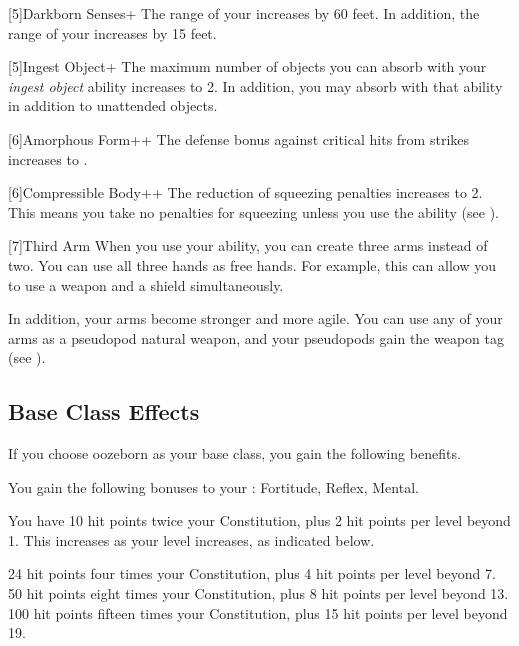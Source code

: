         [5]{Darkborn Senses+} The range of your  increases by 60 feet.
        In addition, the range of your  increases by 15 feet.

        [5]{Ingest Object+} The maximum number of objects you can absorb with your \textit{ingest object} ability increases to 2.
        In addition, you may absorb  with that ability in addition to unattended objects.

        [6]{Amorphous Form++} The defense bonus against critical hits from strikes increases to .

        [6]{Compressible Body++} The reduction of squeezing penalties increases to 2.
        This means you take no penalties for squeezing unless you use the  ability (see ).

        [7]{Third Arm} When you use your  ability, you can create three arms instead of two.
        You can use all three hands as free hands.
        For example, this can allow you to use a  weapon and a shield simultaneously.

        In addition, your arms become stronger and more agile.
        You can use any of your arms as a pseudopod natural weapon, and your pseudopods gain the  weapon tag (see ).

    \subsection{Base Class Effects}
        If you choose oozeborn as your base class, you gain the following benefits.

        You gain the following bonuses to your :  Fortitude,  Reflex,  Mental.

            You have 10 hit points \add twice your Constitution, plus 2 hit points per level beyond 1.
            This increases as your level increases, as indicated below.
            \begin{itemize}
                 24 hit points \add four times your Constitution, plus 4 hit points per level beyond 7.
                 50 hit points \add eight times your Constitution, plus 8 hit points per level beyond 13.
                 100 hit points \add fifteen times your Constitution, plus 15 hit points per level beyond 19.
            \end{itemize}

